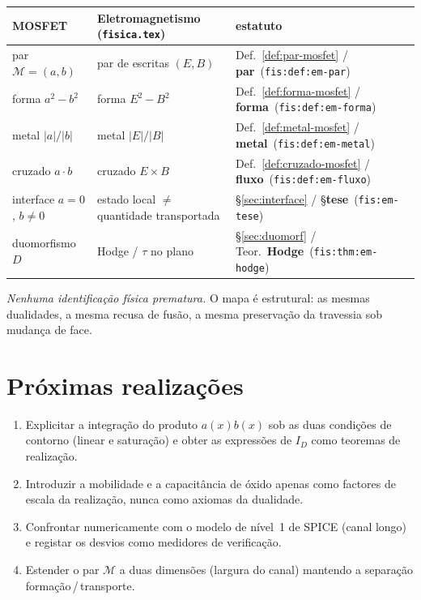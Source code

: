 \documentclass[11pt,a4paper]{article}
\newcommand{\code}[1]{\texttt{\small #1}}
\newcommand{\fis}[2]{\textbf{#2}~\textnormal{(\code{#1})}}
\begin{document}
\begin{center}
\small
\begin{tabular}{@{}p{}p{}p{}@{}}
\toprule
\textbf{MOSFET} & \textbf{Eletromagnetismo (\code{fisica.tex})} & \textbf{estatuto} \\
\midrule
par \(\mathcal M=(a,b)\) & par de escritas \((E,B)\) & Def.~\ref{def:par-mosfet} / \fis{fis:def:em-par}{par} \\
forma \(a^{2}-b^{2}\) & forma \(E^{2}-B^{2}\) & Def.~\ref{def:forma-mosfet} / \fis{fis:def:em-forma}{forma} \\
metal \(\lvert a\rvert/\lvert b\rvert\) & metal \(\lvert E\rvert/\lvert B\rvert\) & Def.~\ref{def:metal-mosfet} / \fis{fis:def:em-metal}{metal} \\
cruzado \(a\cdot b\) & cruzado \(E\times B\) & Def.~\ref{def:cruzado-mosfet} / \fis{fis:def:em-fluxo}{fluxo} \\
interface \(a=0\), \(b\neq0\) & estado local \(\neq\) quantidade transportada & \S\ref{sec:interface} / \S\fis{fis:em-tese}{tese} \\
duomorfismo \(D\) & Hodge / \(\tau\) no plano & \S\ref{sec:duomorf} / Teor.~\fis{fis:thm:em-hodge}{Hodge} \\
\bottomrule
\end{tabular}
\end{center}

\medskip\noindent
\emph{Nenhuma identificação física prematura.} O mapa é estrutural:
as mesmas dualidades, a mesma recusa de fusão, a mesma preservação
da travessia sob mudança de face.


\section{Próximas realizações}

\begin{enumerate}
\item Explicitar a integração do produto \(a(x)b(x)\) sob as duas
  condições de contorno (linear e saturação) e obter as expressões
  de \(I_D\) como teoremas de realização.
\item Introduzir a mobilidade e a capacitância de óxido apenas como
  factores de escala da realização, nunca como axiomas da dualidade.
\item Confrontar numericamente com o modelo de nível~1 de SPICE
  (canal longo) e registar os desvios como medidores de verificação.
\item Estender o par \(\mathcal M\) a duas dimensões (largura do canal)
  mantendo a separação formação\,/\,transporte.
\end{enumerate}
\end{document}
